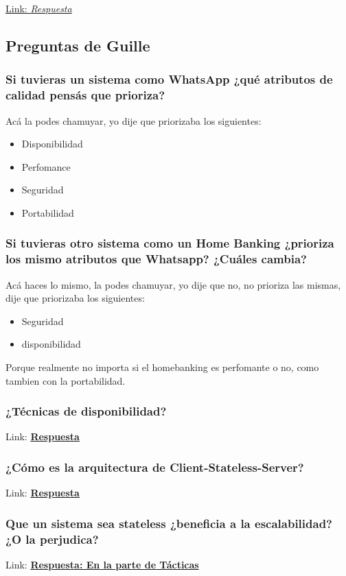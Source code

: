 \documentclass{article}
\begin{document}
    \hyperlink{page.43}{Link: \textit{Respuesta}}


   \subsection{Preguntas de Guille}
   
   \subsubsection{Si tuvieras un sistema como WhatsApp ¿qué atributos de calidad pensás que prioriza?}
    Acá la podes chamuyar, yo dije que priorizaba los siguientes: 
    \begin{itemize}
        \item Disponibilidad
        \item Perfomance
        \item Seguridad
        \item Portabilidad
    \end{itemize}

  \subsubsection{Si tuvieras otro sistema como un Home Banking ¿prioriza los mismo atributos que Whatsapp? ¿Cuáles cambia?}
    Acá haces lo mismo, la podes chamuyar, yo dije que no, no prioriza las mismas, dije que priorizaba los siguientes: 
    \begin{itemize}
        \item Seguridad
        \item disponibilidad
    \end{itemize}

    Porque realmente no importa si el homebanking es perfomante o no, como tambien con la portabilidad. 


  \subsubsection{¿Técnicas de disponibilidad?}
    Link: \textbf{\hyperlink{page.7}{Respuesta}}

  \subsubsection{¿Cómo es la arquitectura de Client-Stateless-Server?}
    Link: \textbf{\hyperlink{page.24}{Respuesta}}

  \subsubsection{Que un sistema sea stateless ¿beneficia a la escalabilidad? ¿O la perjudica? }
    Link: \textbf{\hyperlink{page.12}{Respuesta: En la parte de Tácticas}}
\end{document}
